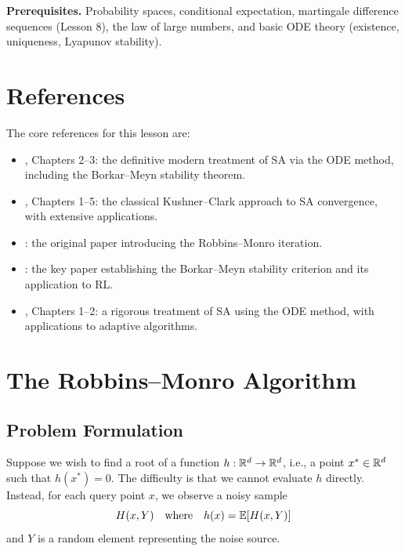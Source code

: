 \documentclass[11pt,a4paper]{article}
\begin{document}
\medskip
\noindent\textbf{Prerequisites.} Probability spaces, conditional
expectation, martingale difference sequences (Lesson 8), the law of
large numbers, and basic ODE theory (existence, uniqueness, Lyapunov
stability).


\section{References}
\label{sec:references}

The core references for this lesson are:
\begin{itemize}[leftmargin=2em]
  \item \citet{borkar2008}, Chapters 2--3: the definitive modern
    treatment of SA via the ODE method, including the Borkar--Meyn
    stability theorem.
  \item \citet{kushner2003}, Chapters 1--5: the classical Kushner--Clark
    approach to SA convergence, with extensive applications.
  \item \citet{robbins1951}: the original paper introducing the
    Robbins--Monro iteration.
  \item \citet{borkar2000}: the key paper establishing the Borkar--Meyn
    stability criterion and its application to RL.
  \item \citet{benveniste2012}, Chapters 1--2: a rigorous treatment of
    SA using the ODE method, with applications to adaptive algorithms.
\end{itemize}


\section{The Robbins--Monro Algorithm}
\label{sec:robbins-monro}

\subsection{Problem Formulation}

Suppose we wish to find a root of a function $h : \mathbb{R}^d \to \mathbb{R}^d$,
i.e., a point $x^* \in \mathbb{R}^d$ such that $h(x^*) = 0$. The difficulty
is that we cannot evaluate $h$ directly. Instead, for each query point
$x$, we observe a noisy sample
\[
  H(x, Y) \quad \text{where} \quad h(x) = \mathbb{E}[H(x, Y)]
\]
and $Y$ is a random element representing the noise source.
\end{document}
